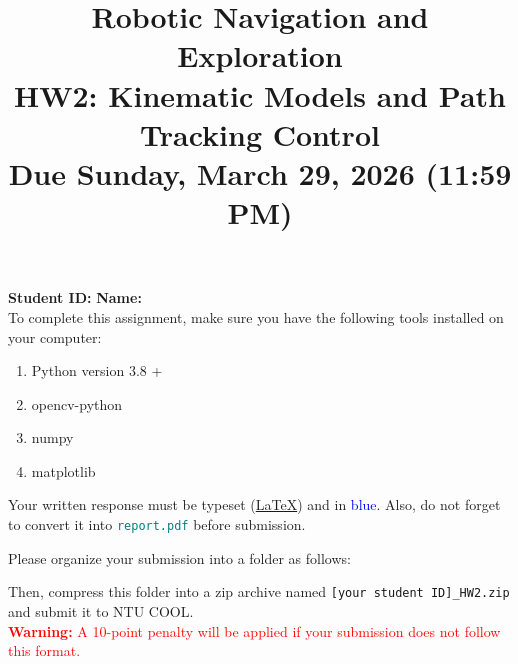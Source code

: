 \documentclass[11pt]{article}
\title{Robotic Navigation and Exploration\\HW2: Kinematic Models and Path Tracking Control\\Due Sunday, March 29, 2026 (11:59 PM)}
\author{}
\date{}
\begin{document}
\maketitle

\noindent\textbf{Student ID:} \underline{\makebox[5cm][l]{\textcolor{blue}{N26140692}}}\hfill\textbf{Name:} \underline{\makebox[5cm][l]{\textcolor{blue}{簡誌加}}} \\


\noindent To complete this assignment, make sure you have the following tools installed on your computer:
\begin{enumerate}
    \item Python version 3.8 +
    \item opencv-python
    \item numpy
    \item matplotlib
\end{enumerate}

\noindent Your written response must be typeset (\href{https://www.overleaf.com/read/xjnwwpbhzvhk#c13aac}{\LaTeX}) and in \textcolor{blue}{blue}. Also, do not forget to convert it into \textcolor{teal}{\texttt{report.pdf}} before submission.

\vspace{0.5em}
\noindent Please organize your submission into a folder as follows:
\vspace{0.5em}

\noindent
{}
\vspace{0.5em}

\noindent Then, compress this folder into a zip archive named \texttt{[your student ID]\_HW2.zip} and submit it to NTU COOL. \\
\textcolor{red}{\textbf{Warning:} A 10-point penalty will be applied if your submission does not follow this format.}
\end{document}
